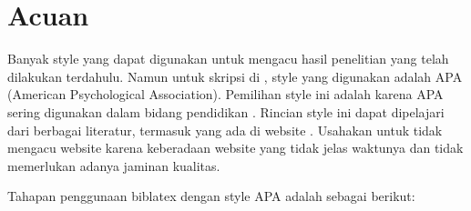 \chapter{Acuan}

Banyak style yang dapat digunakan untuk mengacu hasil penelitian 
yang telah dilakukan terdahulu.  Namun untuk skripsi 
di \institusiTulis, style yang digunakan adalah APA
(American Psychological Association).
Pemilihan style ini adalah karena APA sering digunakan 
dalam bidang pendidikan \autocite{styleGuide}.
Rincian style ini dapat dipelajari dari berbagai literatur,
termasuk yang ada di website \cite{APAPurdue}.
Usahakan untuk tidak mengacu website karena 
keberadaan website yang tidak jelas waktunya dan tidak memerlukan
adanya jaminan kualitas.

Tahapan penggunaan biblatex dengan style APA adalah sebagai berikut:
